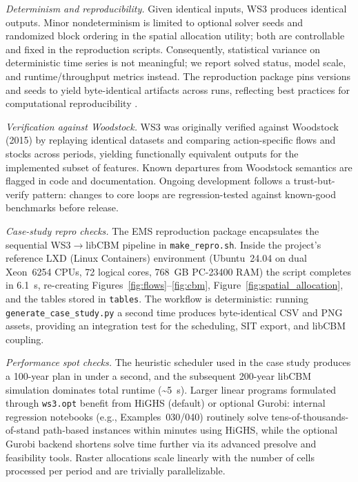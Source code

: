 \documentclass[review]{elsarticle}
\begin{document}
\emph{Determinism and reproducibility.} Given identical inputs, WS3 produces identical outputs. Minor nondeterminism is limited to optional solver seeds and randomized block ordering in the spatial allocation utility; both are controllable and fixed in the reproduction scripts. Consequently, statistical variance on deterministic time series is not meaningful; we report solved status, model scale, and runtime/throughput metrics instead. The reproduction package pins versions and seeds to yield byte-identical artifacts across runs, reflecting best practices for computational reproducibility \citep{peng2011reproducible}.

\emph{Verification against Woodstock.} WS3 was originally verified against Woodstock (2015) by replaying identical datasets and comparing action-specific flows and stocks across periods, yielding functionally equivalent outputs for the implemented subset of features. Known departures from Woodstock semantics are flagged in code and documentation. Ongoing development follows a trust-but-verify pattern: changes to core loops are regression-tested against known-good benchmarks before release.

\emph{Case-study repro checks.} The EMS reproduction package encapsulates the sequential WS3$\to$libCBM pipeline in \texttt{make\_repro.sh}. Inside the project’s reference LXD (Linux Containers) environment (Ubuntu~24.04 on dual Xeon~6254 CPUs, 72 logical cores, 768~GB PC-23400 RAM) the script completes in 6.1~s, re-creating Figures~\ref{fig:flows}--\ref{fig:cbm}, Figure~\ref{fig:spatial_allocation}, and the tables stored in \texttt{tables}. The workflow is deterministic: running \texttt{generate\_case\_study.py} a second time produces byte-identical CSV and PNG assets, providing an integration test for the scheduling, SIT export, and libCBM coupling.

\emph{Performance spot checks.} The heuristic scheduler used in the case study produces a 100-year plan in under a second, and the subsequent 200-year libCBM simulation dominates total runtime (\textasciitilde5~s). Larger linear programs formulated through \texttt{ws3.opt} benefit from HiGHS (default) or optional Gurobi: internal regression notebooks (e.g., Examples~030/040) routinely solve tens-of-thousands-of-stand path-based instances within minutes using HiGHS, while the optional Gurobi backend shortens solve time further via its advanced presolve and feasibility tools. Raster allocations scale linearly with the number of cells processed per period and are trivially parallelizable.
\end{document}
